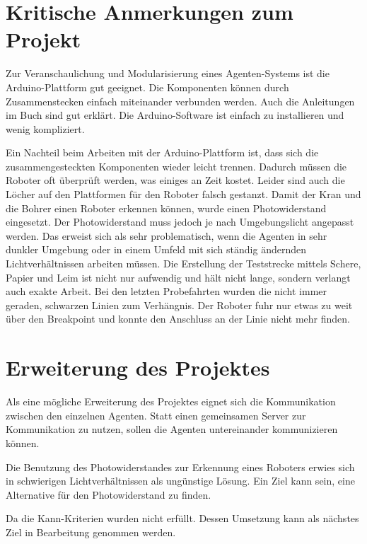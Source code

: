 \section{Kritische Anmerkungen zum Projekt}

Zur Veranschaulichung und Modularisierung eines Agenten-Systems ist die Arduino-Plattform gut geeignet. Die Komponenten können durch Zusammenstecken einfach miteinander verbunden werden. Auch die Anleitungen im Buch sind gut erklärt. Die Arduino-Software ist einfach zu installieren und wenig kompliziert.

Ein Nachteil beim Arbeiten mit der Arduino-Plattform ist, dass sich die zusammengesteckten Komponenten wieder leicht trennen. Dadurch müssen die Roboter oft überprüft werden, was einiges an Zeit kostet. Leider sind auch die Löcher auf den Plattformen für den Roboter falsch gestanzt. Damit der Kran und die Bohrer einen Roboter erkennen können, wurde einen Photowiderstand eingesetzt. Der Photowiderstand muss jedoch je nach Umgebungslicht angepasst werden. Das erweist sich als sehr problematisch, wenn die Agenten in sehr dunkler Umgebung oder in einem Umfeld mit sich ständig ändernden Lichtverhältnissen arbeiten müssen. Die Erstellung der Teststrecke mittels Schere, Papier und Leim ist nicht nur aufwendig und hält nicht lange, sondern verlangt auch exakte Arbeit. Bei den letzten Probefahrten wurden die nicht immer geraden, schwarzen Linien zum Verhängnis. Der Roboter fuhr nur etwas zu weit über den Breakpoint und konnte den Anschluss an der Linie nicht mehr finden.

\section{Erweiterung des Projektes}

Als eine mögliche Erweiterung des Projektes eignet sich die Kommunikation zwischen den einzelnen Agenten. Statt einen gemeinsamen Server zur Kommunikation zu nutzen, sollen die Agenten untereinander kommunizieren können.

Die Benutzung des Photowiderstandes zur Erkennung eines Roboters erwies sich in schwierigen Lichtverhältnissen als ungünstige Lösung. Ein Ziel kann sein, eine Alternative für den Photowiderstand zu finden.

Da die Kann-Kriterien wurden nicht erfüllt. Dessen Umsetzung kann als nächstes Ziel in Bearbeitung genommen werden.
